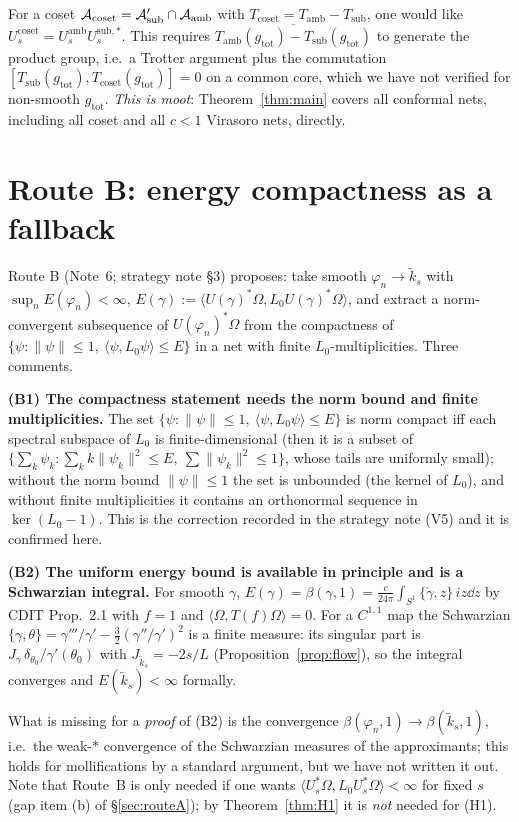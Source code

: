 \documentclass[11pt]{article}
\newcommand{\Om}{\Omega}
\newcommand{\ip}[2]{\langle #1,#2\rangle}
\newcommand{\norm}[1]{\lVert #1\rVert}
\newcommand{\gtot}{g_{\mathrm{tot}}}
\newcommand{\ktil}{\widetilde k}
\begin{document}
\begin{remark}\label{rem:coset}
For a coset $\mathcal A_{\mathrm{coset}}=\mathcal A_{\mathrm{sub}}'\cap\mathcal A_{\mathrm{amb}}$ with
$T_{\mathrm{coset}}=T_{\mathrm{amb}}-T_{\mathrm{sub}}$, one would like
$U^{\mathrm{coset}}_s=U^{\mathrm{amb}}_sU^{\mathrm{sub},*}_s$.  This requires
$\overline{T_{\mathrm{amb}}(\gtot)-T_{\mathrm{sub}}(\gtot)}$ to generate the product group, i.e.\ a Trotter argument
plus the commutation $[T_{\mathrm{sub}}(\gtot),T_{\mathrm{coset}}(\gtot)]=0$ on a common core, which we have not
verified for non-smooth $\gtot$.  \emph{This is moot}: Theorem~\ref{thm:main} covers all conformal nets, including
all coset and all $c<1$ Virasoro nets, directly.
\end{remark}

\section{Route B: energy compactness as a fallback}\label{sec:routeB}

Route B (Note~6; strategy note \S3) proposes: take smooth $\varphi_n\to\ktil_s$ with $\sup_nE(\varphi_n)<\infty$,
$E(\gamma):=\ip{U(\gamma)^*\Om}{L_0U(\gamma)^*\Om}$, and extract a norm-convergent subsequence of
$U(\varphi_n)^*\Om$ from the compactness of $\{\psi:\norm\psi\le1,\ \ip\psi{L_0\psi}\le E\}$ in a net with
finite $L_0$-multiplicities.  Three comments.

\textbf{(B1) The compactness statement needs the norm bound and finite multiplicities.}  The set
$\{\psi:\norm\psi\le1,\ \ip\psi{L_0\psi}\le E\}$ is norm compact iff each spectral subspace of $L_0$ is
finite-dimensional (then it is a subset of $\{\sum_k\psi_k:\sum_k k\norm{\psi_k}^2\le E,\ \sum\norm{\psi_k}^2\le1\}$,
whose tails are uniformly small); without the norm bound $\norm\psi\le1$ the set is unbounded (the kernel of $L_0$),
and without finite multiplicities it contains an orthonormal sequence in $\ker(L_0-1)$.  This is the correction
recorded in the strategy note (V5) and it is confirmed here.

\textbf{(B2) The uniform energy bound is available in principle and is a Schwarzian integral.}  For smooth $\gamma$,
$E(\gamma)=\beta(\gamma,1)=\frac c{24\pi}\int_{S^1}\{\mathring\gamma,z\}\,iz\dd z$ by CDIT Prop.~2.1 with $f=1$ and
$\ip\Om{T(f)\Om}=0$.  For a $C^{1,1}$ map the Schwarzian $\{\gamma,\theta\}=\gamma'''/\gamma'-\frac32(\gamma''/\gamma')^2$
is a finite measure: its singular part is $J_\gamma\,\delta_{\theta_0}/\gamma'(\theta_0)$ with
$J_{\ktil_s}=-2s/L$ (Proposition~\ref{prop:flow}), so the integral converges and $E(\ktil_s)<\infty$ formally.
\begin{verdictgap}
What is missing for a \emph{proof} of (B2) is the convergence $\beta(\varphi_n,1)\to\beta(\ktil_s,1)$, i.e.\ the
weak-$*$ convergence of the Schwarzian measures of the approximants; this holds for mollifications by a standard
argument, but we have not written it out.  Note that Route~B is only needed if one wants
$\ip{U_s^*\Om}{L_0U_s^*\Om}<\infty$ for fixed $s$ (gap item (b) of \S\ref{sec:routeA}); by
Theorem~\ref{thm:H1} it is \emph{not} needed for (H1).
\end{verdictgap}
\end{document}
